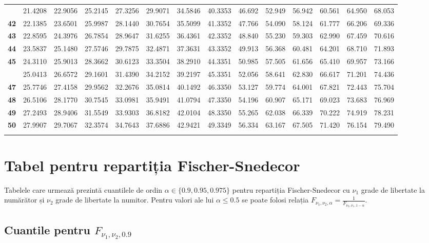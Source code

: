 \documentclass[]{article}
\begin{document}
\begin{longtable}{>{\bfseries}r|rrrrrrrrrrrrr}
\addlinespace
41 & 21.4208 & 22.9056 & 25.2145 & 27.3256 & 29.9071 & 34.5846 & 40.3353 & 46.692 & 52.949 & 56.942 & 60.561 & 64.950 & 68.053\\
42 & 22.1385 & 23.6501 & 25.9987 & 28.1440 & 30.7654 & 35.5099 & 41.3352 & 47.766 & 54.090 & 58.124 & 61.777 & 66.206 & 69.336\\
43 & 22.8595 & 24.3976 & 26.7854 & 28.9647 & 31.6255 & 36.4361 & 42.3352 & 48.840 & 55.230 & 59.303 & 62.990 & 67.459 & 70.616\\
44 & 23.5837 & 25.1480 & 27.5746 & 29.7875 & 32.4871 & 37.3631 & 43.3352 & 49.913 & 56.368 & 60.481 & 64.201 & 68.710 & 71.893\\
45 & 24.3110 & 25.9013 & 28.3662 & 30.6123 & 33.3504 & 38.2910 & 44.3351 & 50.985 & 57.505 & 61.656 & 65.410 & 69.957 & 73.166\\
\addlinespace
46 & 25.0413 & 26.6572 & 29.1601 & 31.4390 & 34.2152 & 39.2197 & 45.3351 & 52.056 & 58.641 & 62.830 & 66.617 & 71.201 & 74.436\\
47 & 25.7746 & 27.4158 & 29.9562 & 32.2676 & 35.0814 & 40.1492 & 46.3350 & 53.127 & 59.774 & 64.001 & 67.821 & 72.443 & 75.704\\
48 & 26.5106 & 28.1770 & 30.7545 & 33.0981 & 35.9491 & 41.0794 & 47.3350 & 54.196 & 60.907 & 65.171 & 69.023 & 73.683 & 76.969\\
49 & 27.2493 & 28.9406 & 31.5549 & 33.9303 & 36.8182 & 42.0104 & 48.3350 & 55.265 & 62.038 & 66.339 & 70.222 & 74.919 & 78.231\\
50 & 27.9907 & 29.7067 & 32.3574 & 34.7643 & 37.6886 & 42.9421 & 49.3349 & 56.334 & 63.167 & 67.505 & 71.420 & 76.154 & 79.490\\*
\end{longtable}

\endgroup{}

\section{Tabel pentru repartiția
Fischer-Snedecor}\label{tabel-pentru-repartitia-fischer-snedecor}

Tabelele care urmează prezintă cuantilele de ordin
\(\alpha\in\{0.9, 0.95, 0.975\}\) pentru repartiția Fischer-Snedecor cu
\(\nu_1\) grade de libertate la numărător și \(\nu_2\) grade de
libertate la numitor. Pentru valori ale lui \(\alpha \leq 0.5\) se poate
folosi relația
\(F_{\nu_1, \nu_2, \alpha} = \frac{1}{F_{\nu_2, \nu_1, 1-\alpha}}\).

\subsection{\texorpdfstring{Cuantile pentru
\(F_{\nu_1, \nu_2, 0.9}\)}{Cuantile pentru F\_\{\textbackslash{}nu\_1, \textbackslash{}nu\_2, 0.9\}}}\label{cunatile-pentru-f_nu_1-nu_2-0.9}
\end{document}
